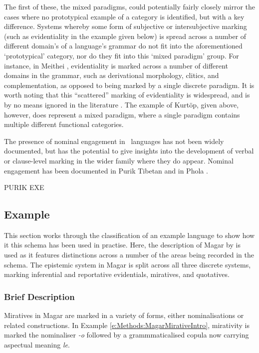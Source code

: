 The first of these, the mixed paradigms, could potentially fairly closely mirror the cases where no prototypical example of a category is identified, but with a key difference. Systems whereby some form of subjective or intersubjective marking (such as evidentiality in the example given below) is spread across a number of different domain's of a language's grammar do not fit into the aforementioned `prototypical' category, nor do they fit into this `mixed paradigm' group. For instance, in Meithei \cite[295]{Chelliah1997}, evidentiality is marked across a number of different domains in the grammar, such as derivational morphology, clitics, and complementation, as opposed to being marked by a single discrete paradigm. It is worth noting that this ``scattered'' marking of evidentiality is widespread, and is by no means ignored in the literature \cite[23]{Aikhenvald2014}. The example of Kurtöp, given above, however, does represent a mixed paradigm, where a single paradigm contains multiple different functional categories.

The presence of nominal engagement in \lfam\ languages has not been widely documented, but has the potential to give insights into the development of verbal or clause-level marking in the wider family where they do appear. Nominal engagement has been documented in Purik Tibetan \cite[Tibetic: India:][]{Zemp2021} and in Phola \cite[Ngwi-Burmese, PRC:][]{GonzalezPerez2023}.

PURIK EXE

\subsection{Example}\label{ss:Methods:MagarExample}
This section works through the classification of an example language to show how it this schema has been used in practise. Here, the description of Magar by  is used as it features distinctions across a number of the areas being recorded in the schema. The epistemic system in Magar is split across all three discrete systems, marking inferential and reportative evidentials, miratives, and quotatives.

\subsubsection{Brief Description}
Miratives in Magar are marked in a variety of forms, either nominalisations or related constructions. In Example \ref{e:Methods:MagarMirativeIntro}, mirativity is marked the nominaliser \textit{-o} followed by a grammmaticalised copula now carrying aspectual meaning \textit{le}. 

